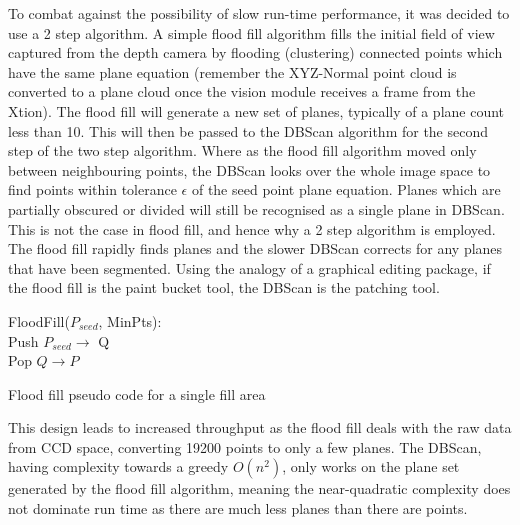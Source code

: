 \documentclass[]{article}
\begin{document}
{To combat against the possibility of slow run-time performance, it was decided to use a 2 step algorithm. A simple flood fill algorithm fills the initial field of view captured from the depth camera by flooding (clustering) connected points which have the same plane equation (remember the XYZ-Normal point cloud is converted to a plane cloud once the vision module receives a frame from the Xtion). The flood fill will generate a new set of planes, typically of a plane count less than 10. This will then be passed to the DBScan algorithm for the second step of the two step algorithm. Where as the flood fill algorithm moved only between neighbouring points, the DBScan looks over the whole image space to find points within tolerance $\epsilon$ of the seed point plane equation. Planes which are partially obscured or divided  will still be recognised as a single plane in DBScan. This is not the case in flood fill, and hence why a 2 step algorithm is employed. The flood fill rapidly finds planes and the slower DBScan corrects for any planes that have been segmented. Using the analogy of a graphical editing package, if the flood fill is the paint bucket tool, the DBScan is the patching tool.

\begin{algorithm}[tbp]
	\SetAlgoLined
	\bigskip
	FloodFill($P_{seed}$, MinPts): \\
	Push $P_{seed} \rightarrow$ Q \\
	{
	 	Pop $Q \rightarrow P$ \\
	}
	\bigskip
	\caption{Flood fill pseudo code for a single fill area}
	\label{alg:flood_fill}
\end{algorithm}

This design leads to increased throughput as the flood fill deals with the raw data from CCD space, converting 19200 points to only a few planes. The DBScan, having complexity towards a greedy $O(n^{2})$, only works on the plane set generated by the flood fill algorithm, meaning the near-quadratic complexity does not dominate run time as there are much less planes than there are points.

}
\end{document}
